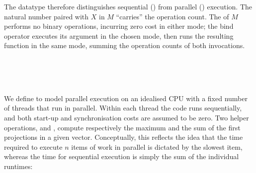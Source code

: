 The  datatype therefore distinguishes sequential () from
parallel () execution.  The natural number paired with $X$ in $M$
``carries'' the operation count.  The  of $M$ performs no binary
operations, incurring zero cost in either mode; the bind operator \AF{\_>>=\_}
executes its argument in the chosen mode, then runs the resulting function in
the same mode, summing the operation counts of both invocations.
\begin{code}[hide]%
%
\>[2]\AgdaSpace{}%
\AgdaSymbol{:}\AgdaSpace{}%
\AgdaSpace{}%
\<%
\\
%
\>[2]\AgdaSpace{}%
\AgdaSymbol{=}\AgdaSpace{}%
\AgdaSpace{}%
\AgdaSpace{}%
\AgdaSpace{}%
\AgdaOperator{\AgdaFunction{\AgdaUnderscore{}>>=\AgdaUnderscore{}}}\<%
\\
%
\\[\AgdaEmptyExtraSkip]%
%
\>[2]\AgdaSpace{}%
\AgdaSpace{}%
\AgdaSpace{}%
\AgdaSpace{}%
\AgdaSymbol{(}\AgdaSymbol{;}\AgdaSpace{}%
\AgdaSymbol{;}\AgdaSpace{}%
\AgdaSymbol{;}\AgdaSpace{}%
\AgdaOperator{\AgdaField{\AgdaUnderscore{}>>=\AgdaUnderscore{}}}\AgdaSymbol{)}\<%
\end{code}
We define  to model parallel execution on an idealised CPU with a
fixed number of threads that run in parallel.  Within each thread the code runs
sequentially, and both start-up and synchronisation costs are assumed to be
zero.  Two helper operations,  and , compute respectively the
maximum and the sum of the first projections in a given vector.  Conceptually,
this reflects the idea that the time required to execute $n$ items of work in
parallel is dictated by the slowest item, whereas the time for sequential
execution is simply the sum of the individual runtimes:
